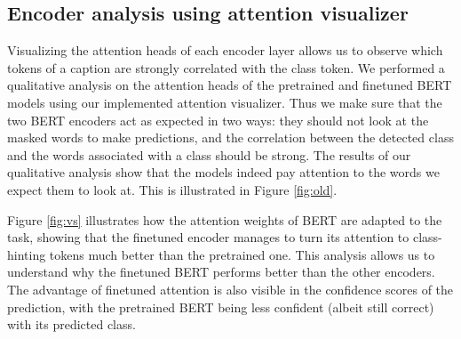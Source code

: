 

\subsection{Encoder analysis using attention visualizer}

Visualizing the attention heads of each encoder layer allows us to observe which tokens of a caption are strongly correlated with the class token. We performed a qualitative analysis on the attention heads of the pretrained and finetuned BERT models using our implemented attention visualizer. Thus we make sure that the two BERT encoders act as expected in two ways: they should not look at the masked words to make predictions, and the correlation between the detected class and the words associated with a class should be strong.
The results of our qualitative analysis show that the models indeed pay attention to the words we expect them to look at. This is illustrated in Figure \ref{fig:old}.

Figure \ref{fig:vs} illustrates how the attention weights of BERT are adapted to the task, showing that the finetuned encoder manages to turn its attention to class-hinting tokens much better than the pretrained one. This analysis allows us to understand why the finetuned BERT performs better than the other encoders. The advantage of finetuned attention is also visible in the confidence scores of the prediction, with the pretrained BERT being less confident (albeit still correct) with its predicted class. 


